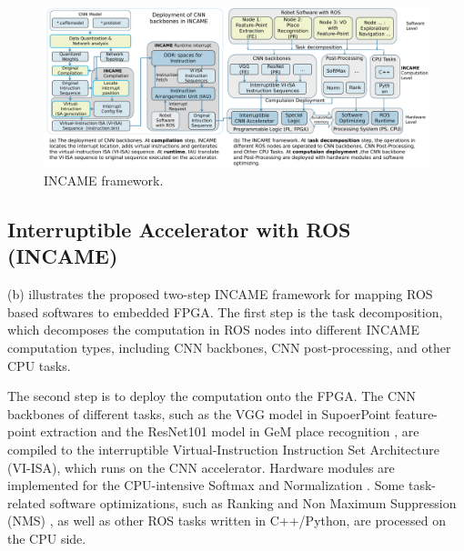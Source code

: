 \begin{figure}[t]
	\centering
    \includegraphics[width=0.9\linewidth]{fig/incame.pdf}
    \caption{ INCAME framework.}
	\label{fig:incame}
\end{figure}

\subsection{ Interruptible Accelerator with ROS (INCAME) }


(b) illustrates the proposed two-step INCAME framework for mapping ROS based softwares to embedded FPGA.
The first step is the task decomposition, which decomposes the computation in ROS nodes into different INCAME computation types, including CNN backbones, CNN post-processing, and other CPU tasks. 

The second step is to deploy the computation onto the FPGA. 
The CNN backbones of different tasks, such as the VGG model \cite{kim2016accurate} in SupoerPoint feature-point extraction \cite{detone2018superpoint} and the ResNet101 model \cite{he2016deep} in GeM place recognition \cite{radenovic2018fine}, are compiled to the interruptible Virtual-Instruction Instruction Set Architecture (VI-ISA), which runs on the CNN accelerator.
Hardware modules are implemented for the CPU-intensive Softmax \cite{Softmax-wiki} and Normalization \cite{Norm}. Some task-related software optimizations, such as Ranking and Non Maximum Suppression (NMS) \cite{NeubeckGool-NMS}, as well as other ROS tasks written in C++/Python, are processed on the CPU side.

